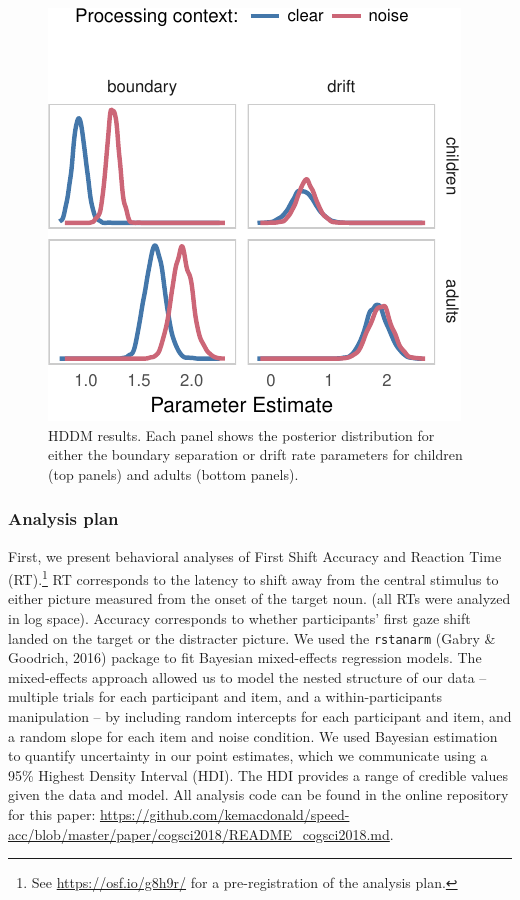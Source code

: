 \documentclass[10pt, letterpaper]{article}
\newenvironment{CodeChunk}{}{}
\begin{document}
\begin{CodeChunk}
\begin{figure}[t]

{\centering \includegraphics[width=0.85\linewidth]{figs/hddm_plot_noise-1} 

}

\caption[HDDM results]{HDDM results. Each panel shows the posterior distribution for either the boundary separation or drift rate parameters for children (top panels) and adults (bottom panels).}\label{fig:hddm_plot_noise}
\end{figure}
\end{CodeChunk}

\subsubsection{Analysis plan}\label{analysis-plan}

First, we present behavioral analyses of First Shift Accuracy and
Reaction Time (RT).\footnote{See \url{https://osf.io/g8h9r/} for a
  pre-registration of the analysis plan.} RT corresponds to the latency
to shift away from the central stimulus to either picture measured from
the onset of the target noun. (all RTs were analyzed in log space).
Accuracy corresponds to whether participants' first gaze shift landed on
the target or the distracter picture. We used the \texttt{rstanarm}
(Gabry \& Goodrich, 2016) package to fit Bayesian mixed-effects
regression models. The mixed-effects approach allowed us to model the
nested structure of our data -- multiple trials for each participant and
item, and a within-participants manipulation -- by including random
intercepts for each participant and item, and a random slope for each
item and noise condition. We used Bayesian estimation to quantify
uncertainty in our point estimates, which we communicate using a 95\%
Highest Density Interval (HDI). The HDI provides a range of credible
values given the data and model. All analysis code can be found in the
online repository for this paper:
\url{https://github.com/kemacdonald/speed-acc/blob/master/paper/cogsci2018/README_cogsci2018.md}.
\end{document}

